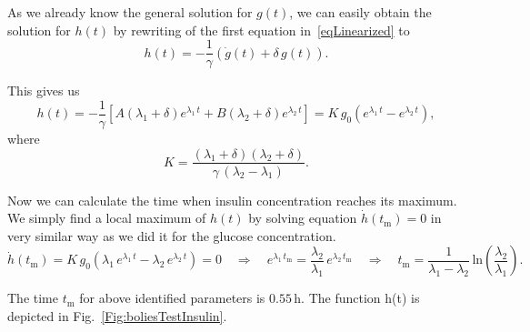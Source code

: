 \documentclass{article}
\providecommand{\m}[1]{\ensuremath{\mathrm{#1}}}
\begin{document}
As we already know the general solution for $g(t)$, we can easily obtain the solution for $h(t)$ by rewriting of the first equation in~\eqref{eqLinearized} to
\begin{equation}
	h(t) = -\frac{1}{\gamma}\left( \dot{g}(t) + \delta\,g(t)\right).
\end{equation}

This gives us
\begin{equation}
	h(t) = -\frac{1}{\gamma}\left[   A(\lambda_1 + \delta)e^{\lambda_1\,t} + B(\lambda_2 + \delta)e^{\lambda_2\,t}  \right] = K\,g_0 \left(e^{\lambda_1\,t} - e^{\lambda_2\,t} \right),
\end{equation}
where $$K=\frac{(\lambda_1+\delta)(\lambda_2+\delta)}{\gamma\,(\lambda_2-\lambda_1)}.$$

Now we can calculate the time when insulin concentration reaches its maximum. We simply find a local maximum of $h(t)$ by solving equation $\dot{h}(t_\m{m})=0$ in very similar way as we did it for the glucose concentration.
\begin{equation*}
	\dot{h}(t_\m{m}) = K\,g_0 \left( \lambda_1\,e^{\lambda_1 \, t} - \lambda_2\,e^{\lambda_2 \, t} \right) = 0		\quad\Rightarrow\quad
	e^{\lambda_1\,t_\m{m}} = \frac{\lambda_2}{\lambda_1}\,e^{\lambda_2\,t_\m{m}} 	\quad\Rightarrow\quad
	t_\m{m} = \frac{1}{\lambda_1 - \lambda_2}\,\m{ln}\left(\frac{\lambda_2}{\lambda_1}\right).
\end{equation*}

The time $t_\m{m}$ for above identified parameters is $0.55\,\si{\hour}$. The function h(t) is depicted in Fig.~\ref{Fig:boliesTestInsulin}.
\end{document}
